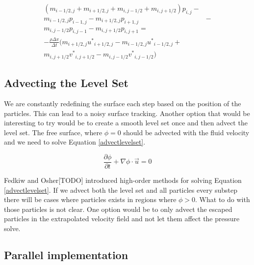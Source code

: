 \begin{equation}
\begin{split}
(m_{i-1/2,j} + m_{i+1/2,j} + m_{i,j-1/2} + m_{i,j+1/2})p_{i,j} - \\ 
m_{i-1/2,j} p_{i-1,j} - 
m_{i+1/2,j}p_{i+1,j} & - \\
m_{i,j-1/2}p_{i,j-1} - 
m_{i,j+1/2}p_{i,j+1} = \\ 
-\frac{\rho \Delta x}{\Delta t}(m_{i+1/2,j}{u^*}_{i+1/2,j} - m_{i-1/2,j}{u^*}_{i-1/2,j} + \\
m_{i,j+1/2}{v^*}_{i,j+1/2} - m_{i,j-1/2} {v^*}_{i,j-1/2})
\end{split}
\label{pressureeqvariational}
\end{equation}

\subsection{Advecting the Level Set}

We are constantly redefining the surface each step based on the position of the particles. This can lead to a noisy surface tracking. Another option that would be interesting to try would be to create a smooth level set once and then advect the level set. The free surface, where $\phi = 0$ should be advected with the fluid velocity and we need to solve Equation \ref{advectlevelset}.

\begin{equation}
\frac{\partial \phi}{\partial t} + \nabla \phi \cdot \vec{u} = 0
\label{advectlevelset}
\end{equation}

Fedkiw and Osher[TODO] introduced high-order methods for solving Equation \ref{advectlevelset}. If we advect both the level set and all particles every substep there will be cases where particles exists in regions where $\phi > 0$. What to do with those particles is not clear. One option would be to only advect the escaped particles in the extrapolated velocity field and not let them affect the pressure solve.

\subsection{Parallel implementation}

